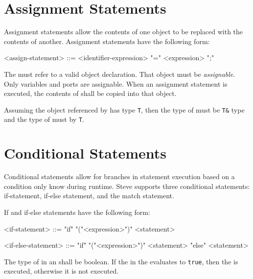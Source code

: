 \section{Assignment Statements} \label{guide:assign_stmt}

Assignment statements allow the contents of one object to be replaced with the contents of another. Assignment statements have the following form:

\begin{minip}
\begin{grammar}
<assign-statement> ::=
<identifier-expression> "=" <expression> ";"
\end{grammar}
\end{minip}

The  must refer to a valid object declaration. That object must be \textit{assignable}. Only variables and ports are assignable. When an assignment statement is executed, the contents of  shall be copied into that object.

Assuming the object referenced by  has type \texttt{T}, then the type of  must be \texttt{T\&} type and the type of  must by \texttt{T}.

\section{Conditional Statements} \label{guide:condition_stmt}

Conditional statements allow for branches in statement execution based on a condition only know during runtime. Steve supports three conditional statements: if-statement, if-else statement, and the match statement.

If and if-else statements have the following form:

\begin{minip}
\begin{grammar}
<if-statement> ::= "if" "("<expression>")" <statement>

<if-else-statement> ::= "if" "("<expression>")" <statement> "else" <statement>
\end{grammar}
\end{minip}

The type of  in an  shall be boolean. If the  in the  evaluates to \texttt{true}, then the  is executed, otherwise it is not executed. 


